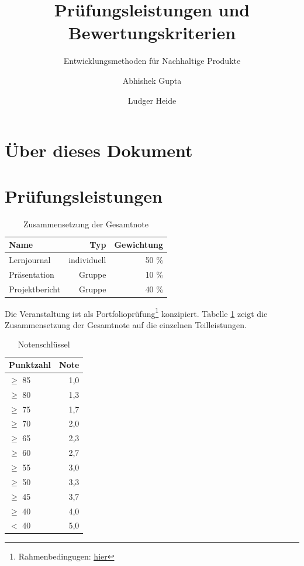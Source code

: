\documentclass[DIV=15,headinclude]{scrartcl}
\begin{document}
\title{Prüfungsleistungen und Bewertungskriterien}
\subtitle{Entwicklungsmethoden für Nachhaltige Produkte}
\author{Abhishek Gupta \and Ludger Heide}
\maketitle

\tableofcontents


\listoftodos

\section{Über dieses Dokument}

\section{Prüfungsleistungen}

\begin{table}
	\centering
	\caption{Zusammensetzung der Gesamtnote}
	\label{tab:zusammensetzung}
	\begin{tabular}{lrr}
		\toprule
		Name & Typ & Gewichtung \\
		\midrule
		Lernjournal & individuell & 50 \% \\		
		Präsentation & Gruppe & 10 \% \\
		Projektbericht & Gruppe & 40 \% \\	
		\bottomrule
	\end{tabular}
\end{table}

Die Veranstaltung ist als Portfolioprüfung\footnote{Rahmenbedingugen: \href{https://www.tu-berlin.de/asv/menue/gremien/kommissionen_des_as/hinweise_zur_allgstupo/hinweise_zu_portfoliopruefungen/}{\underline{hier}}} konzipiert. Tabelle \ref{tab:zusammensetzung} zeigt die Zusammensetzung der Gesamtnote auf die einzelnen Teilleistungen.

\begin{table}
	\centering
	\caption{Notenschlüssel}
	\label{tab:notenschlüssel}
	\begin{tabular}{lr}
		\toprule
		Punktzahl & Note \\
		\midrule
		$\geq$ 85 & 1,0 \\
		$\geq$ 80 & 1,3 \\
		$\geq$ 75 & 1,7 \\
		$\geq$ 70 & 2,0 \\
		$\geq$ 65 & 2,3 \\
		$\geq$ 60 & 2,7 \\
		$\geq$ 55 & 3,0 \\
		$\geq$ 50 & 3,3 \\
		$\geq$ 45 & 3,7 \\
		$\geq$ 40 & 4,0 \\
		$<$ 40  & 5,0 \\
		\bottomrule
	\end{tabular}
\end{table}
\end{document}
